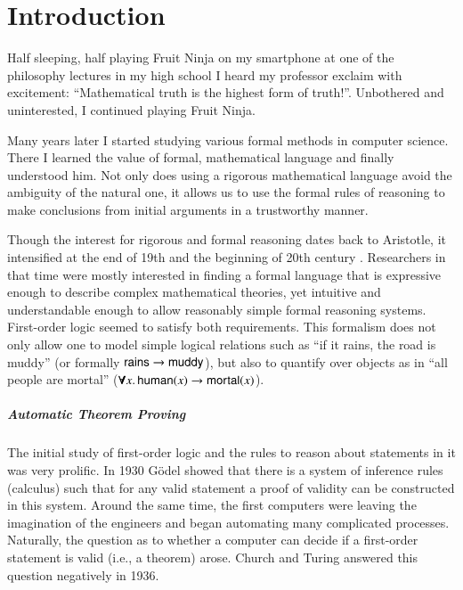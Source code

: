 \chapter{Introduction}
\label{ch:intro}

Half sleeping, half playing Fruit Ninja on my smartphone at one of the
philosophy lectures in my high school I heard my professor exclaim with
excitement: “Mathematical truth is the highest form of truth!”.
Unbothered and uninterested, I continued playing Fruit Ninja.

Many years later I started studying various formal methods in computer science.
There I learned the value of formal, mathematical language and finally
understood him. Not only does using a rigorous mathematical language avoid the
ambiguity of the natural one, it allows us to use the formal rules of reasoning
to make conclusions from initial arguments in a trustworthy manner. 

Though the interest for rigorous and formal reasoning dates back to Aristotle,
it intensified at the end of 19th and the beginning of 20th century
\cite{jf-01-modern-logic}. Researchers in that time were mostly interested in
finding a formal language that is expressive enough to describe complex
mathematical theories, yet intuitive and understandable enough to allow
reasonably simple formal reasoning systems. First-order logic seemed to satisfy
both requirements.  This formalism does not only allow one to model simple
logical relations such as ``if it rains, the road is muddy'' (or formally
$\mathsf{rains} \rightarrow \mathsf{muddy}$), but also to quantify over objects as in ``all
people are mortal'' ($\pmb\forall x.\, \mathsf{human}(x) \rightarrow \mathsf{mortal}(x)$).

\paragraph{Automatic Theorem Proving}The initial study of first-order logic and the rules to reason about statements in
it was very prolific. In 1930 G\"odel \cite{kg-30-completeness-theorem} showed
that there is a system of inference rules (calculus) such that for any valid
statement a proof of validity can be constructed in this system. Around the same
time, the first computers were leaving the imagination of the engineers and
began automating many complicated processes.  Naturally, the question as to
whether a computer can decide if a first-order statement is valid (i.e., a
theorem) arose. Church \cite{ac-36-fol-undecidable} and Turing
\cite{tm-37-undecidable} answered this question negatively in 1936.

